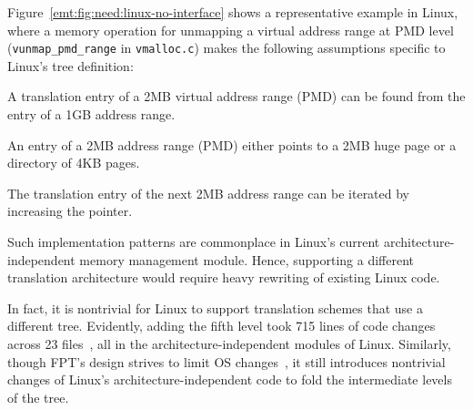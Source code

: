 


Figure~\ref{emt:fig:need:linux-no-interface} shows a representative example in Linux, where a memory
	operation for unmapping a virtual address range at PMD level (\texttt{\small vunmap\_pmd\_range} in \texttt{\small vmalloc.c}) 
	makes the following
	assumptions specific to Linux's tree definition:
\begin{packed_itemize}%
		\item A translation entry of a 2MB virtual address range (PMD)
			can be found from the entry of a 1GB address range.
		\item An entry of a 2MB address range (PMD) either points to 
			a 2MB huge page or a directory of 4KB pages.
		\item The translation entry of the next 2MB address range can be 
			iterated by increasing the pointer.
\end{packed_itemize}
Such implementation patterns are commonplace in Linux's current architecture-independent memory management module.
Hence, supporting a different translation architecture would require heavy rewriting
	of existing Linux code.

In fact, 
	it is  nontrivial for Linux to support translation schemes that use a different tree. %
Evidently, adding the fifth level took 715 lines of code changes across 23 files~\cite{linux:5levelimpl},
	all in the architecture-independent modules of Linux.
Similarly, though FPT's design strives to limit OS changes~\cite{park2022fpt},
	it still introduces nontrivial changes of Linux's architecture-independent code
	to fold the intermediate levels of the tree.
	

